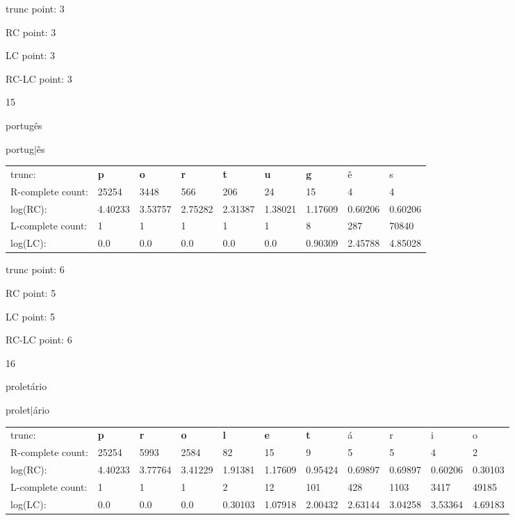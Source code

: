 \documentclass{article}
\begin{document}
trunc point: 3

RC point: 3

LC point: 3

RC-LC point: 3

\vspace{3em}



15

portugês

portug$|$ês

\vspace{1em}

\begin{tabular}{l|llllllll}

trunc: & {\color{red}\bf p} & {\color{red}\bf o} & {\color{red}\bf r} & {\color{red}\bf t} & {\color{red}\bf u} & {\color{red}\bf g} & ê & s \\ 
R-complete count: & 25254 & 3448 & 566 & 206 & 24 & 15 & 4 & 4 \\ 
log(RC): & 4.40233 & 3.53757 & 2.75282 & 2.31387 & 1.38021 & 1.17609 & 0.60206 & 0.60206 \\ 
L-complete count: & 1 & 1 & 1 & 1 & 1 & 8 & 287 & 70840 \\ 
log(LC): & 0.0 & 0.0 & 0.0 & 0.0 & 0.0 & 0.90309 & 2.45788 & 4.85028 \\ 
\end{tabular}

trunc point: 6

RC point: 5

LC point: 5

RC-LC point: 6

\vspace{3em}



16

proletário

prolet$|$ário

\vspace{1em}

\begin{tabular}{l|llllllllll}

trunc: & {\color{red}\bf p} & {\color{red}\bf r} & {\color{red}\bf o} & {\color{red}\bf l} & {\color{red}\bf e} & {\color{red}\bf t} & á & r & i & o \\ 
R-complete count: & 25254 & 5993 & 2584 & 82 & 15 & 9 & 5 & 5 & 4 & 2 \\ 
log(RC): & 4.40233 & 3.77764 & 3.41229 & 1.91381 & 1.17609 & 0.95424 & 0.69897 & 0.69897 & 0.60206 & 0.30103 \\ 
L-complete count: & 1 & 1 & 1 & 2 & 12 & 101 & 428 & 1103 & 3417 & 49185 \\ 
log(LC): & 0.0 & 0.0 & 0.0 & 0.30103 & 1.07918 & 2.00432 & 2.63144 & 3.04258 & 3.53364 & 4.69183 \\ 
\end{tabular}
\end{document}
